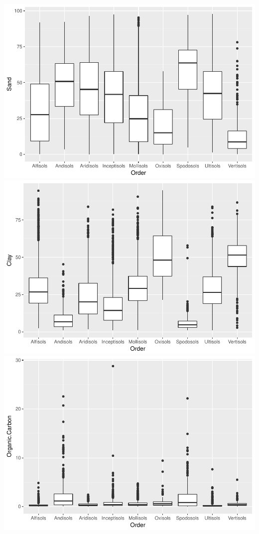 \documentclass[]{article}
\begin{document}
\includegraphics{Project1_files/figure-latex/EDA - Mer-1.pdf}
\includegraphics{Project1_files/figure-latex/EDA - Mer-2.pdf}
\includegraphics{Project1_files/figure-latex/EDA - Mer-3.pdf}
\end{document}
